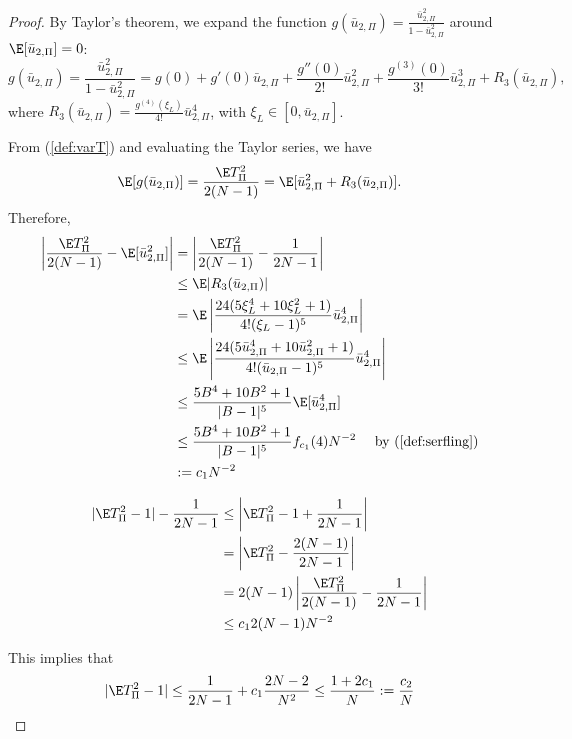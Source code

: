 \begin{proof}
  By Taylor's theorem, we expand the function $g(\bar{u}_{2,\Pi}) =
  \frac{\bar{u}_{2,\Pi}^2}{1-\bar{u}_{2,\Pi}^2}$ around $\E[\bar{u}_{2,\Pi}] = 0$: 
  \begin{equation*}
    g(\bar{u}_{2,\Pi}) = \frac{\bar{u}_{2,\Pi}^2}{1-\bar{u}_{2,\Pi}^2} = g(0) + g'(0)
    \bar{u}_{2,\Pi} + \frac{g''(0)}{2!}\bar{u}_{2,\Pi}^2 +
    \frac{g^{(3)}(0)}{3!}\bar{u}_{2,\Pi}^3 + R_3(\bar{u}_{2,\Pi}),
  \end{equation*}
  where $R_3(\bar{u}_{2,\Pi}) = \frac{g^{(4)}(\xi_L)}{4!}\bar{u}_{2,\Pi}^4$, with
  $\xi_L \in [0, \bar{u}_{2,\Pi}]$.

  From (\ref{def:varT}) and evaluating the Taylor series, we have 
  \begin{equation*}
    \E[g(\bar{u}_{2,\Pi})] = \frac{\E T_{\Pi}^2}{2(N-1)} = \E[\bar{u}_{2,\Pi}^2 + R_3(\bar{u}_{2,\Pi})].
  \end{equation*}
  Therefore,
  \begin{align*}
    \left | \frac{\E T_{\Pi}^2}{2(N-1)} - \E[\bar{u}_{2,\Pi}^2] \right | 
    &= \left | \frac{\E T_{\Pi}^2}{2(N-1)} - \frac{1}{2N-1} \right | \\
    &\leq  \E |R_3(\bar{u}_{2,\Pi})| \\
    &= \E \left | \frac{24(5\xi_L^4 + 10 \xi_L^2 +
        1)}{4!(\xi_L-1)^5}\bar{u}_{2,\Pi}^4 \right | \\
    &\leq \E \left | \frac{24(5\bar{u}_{2,\Pi}^4 + 10 \bar{u}_{2,\Pi}^2 +
        1)}{4!(\bar{u}_{2,\Pi}-1)^5}\bar{u}_{2,\Pi}^4 \right | \\
    &\leq \frac{5B^4+10B^2+1}{|B-1|^5} \E [\bar{u}_{2,\Pi}^4] \\
    &\leq \frac{5B^4+10B^2+1}{|B-1|^5} f_{c_1}(4) N^{-2} \quad \text{
      by } (\ref{def:serfling}) \\
    &:= c_1 N^{-2}
  \end{align*}
  
  \begin{align*}
    |\E T_{\Pi}^2 - 1| - \frac{1}{2N-1} 
    &\leq \left | \E T_{\Pi}^2 - 1 + \frac{1}{2N-1} \right | \\
    &= \left | \E T_{\Pi}^2 - \frac{2(N-1)}{2N-1} \right | \\
    &= 2(N-1) \left | \frac{\E T_{\Pi}^2}{2(N-1)} - \frac{1}{2N-1} \right | \\
    &\leq c_1 2(N-1)N^{-2}
  \end{align*}
  
  This implies that 
  \begin{equation*}
    |\E T_{\Pi}^2 - 1| \leq \frac{1}{2N-1} + c_1 \frac{2N-2}{N^2} \leq
    \frac{1 + 2c_1}{N} := \frac{c_2}{N}
  \end{equation*}
\end{proof}

